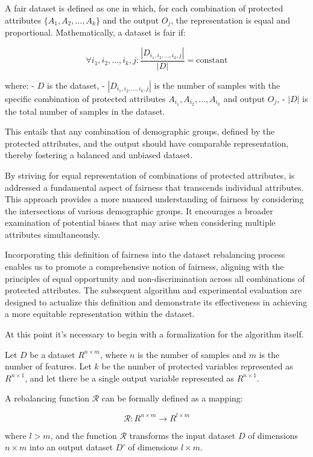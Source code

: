 A fair dataset is defined as one in which, for each combination of protected attributes $\{A_1, A_2, \ldots, A_k\}$ and the output $O_j$, the representation is equal and proportional. Mathematically, a dataset is fair if:

\[
\forall i_1, i_2, \ldots, i_k, j: \frac{|D_{i_1, i_2, \ldots, i_k, j}|}{|D|} = \text{constant}
\]

where:
- $D$ is the dataset,
- $|D_{i_1, i_2, \ldots, i_k, j}|$ is the number of samples with the specific combination of protected attributes $A_{i_1}, A_{i_2}, \ldots, A_{i_k}$ and output $O_j$,
- $|D|$ is the total number of samples in the dataset.

This entails that any combination of demographic groups, defined by the protected attributes, and the output should have comparable representation, thereby fostering a balanced and unbiased dataset.

By striving for equal representation of combinations of protected attributes, is addressed a fundamental aspect of fairness that transcends individual attributes. This approach provides a more nuanced understanding of fairness by considering the intersections of various demographic groups. It encourages a broader examination of potential biases that may arise when considering multiple attributes simultaneously.

Incorporating this definition of fairness into the dataset rebalancing process enables us to promote a comprehensive notion of fairness, aligning with the principles of equal opportunity and non-discrimination across all combinations of protected attributes. The subsequent algorithm and experimental evaluation are designed to actualize this definition and demonstrate its effectiveness in achieving a more equitable representation within the dataset.

At this point it's necessary to begin with a formalization for the algorithm itself.


Let \( D \) be a dataset \( R^{n \times m} \), where \( n \) is the number of samples and \( m \) is the number of features. Let \( k \) be the number of protected variables represented as \( R^{n \times 1} \), and let there be a single output variable represented as \( R^{n \times 1} \).

A rebalancing function \( \mathcal{R} \) can be formally defined as a mapping:

\[
\mathcal{R}: R^{n \times m} \rightarrow R^{l \times m}
\]

where \( l > m \), and the function \( \mathcal{R} \) transforms the input dataset \( D \) of dimensions \( n \times m \) into an output dataset \( D' \) of dimensions \( l \times m \).



